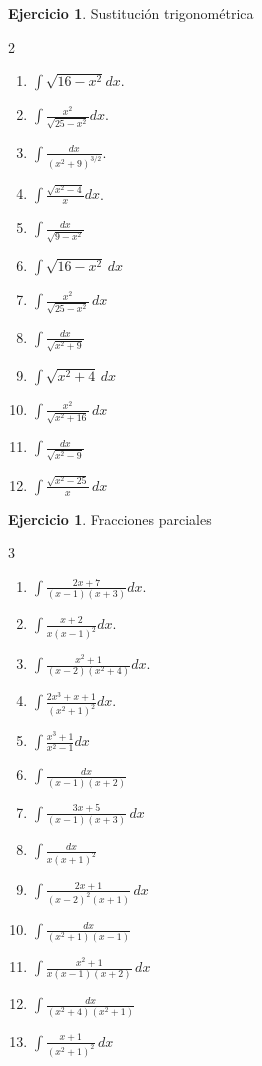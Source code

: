 \documentclass[12pt]{article}
\theoremstyle{definition}
\newtheorem{Ejer}[teorema]{Ejercicio}
\theoremstyle{remark}
\begin{document}
\begin{Ejer}  Sustitución trigonométrica
\begin{multicols}{2}
\begin{enumerate}[resume=integrales]
\item $\int\sqrt{16-x^2}dx$.
\item $\int\frac{x^2}{\sqrt{25-x^2}}dx$.
\item $\int\frac{dx}{(x^2+9)^{3/2}}$.
\item $\int\frac{\sqrt{x^2-4}}{x}dx$.
\item $\displaystyle \int \frac{dx}{\sqrt{9-x^2}}$
\item $\displaystyle \int \sqrt{16-x^2}\,dx$
\item $\displaystyle \int \frac{x^2}{\sqrt{25-x^2}}\,dx$
\item $\displaystyle \int \frac{dx}{\sqrt{x^2+9}}$
\item $\displaystyle \int \sqrt{x^2+4}\,dx$
\item $\displaystyle \int \frac{x^2}{\sqrt{x^2+16}}\,dx$
\item $\displaystyle \int \frac{dx}{\sqrt{x^2-9}}$
\item $\displaystyle \int \frac{\sqrt{x^2-25}}{x}\,dx$
\end{enumerate}
\end{multicols}
\end{Ejer}

\begin{Ejer} Fracciones parciales
\begin{multicols}{3}
\begin{enumerate}[resume=integrales]
\item $\int\frac{2x+7}{(x-1)(x+3)}dx$.
\item $\int\frac{x+2}{x(x-1)^2}dx$.
\item $\int\frac{x^2+1}{(x-2)(x^2+4)}dx$.
\item $\int\frac{2x^3+x+1}{(x^2+1)^2}dx$.
\item $\int\frac{x^3+1}{x^2-1}dx$
\item $\displaystyle \int \frac{dx}{(x-1)(x+2)}$
\item $\displaystyle \int \frac{3x+5}{(x-1)(x+3)}\,dx$
\item $\displaystyle \int \frac{dx}{x(x+1)^2}$
\item $\displaystyle \int \frac{2x+1}{(x-2)^2(x+1)}\,dx$
\item $\displaystyle \int \frac{dx}{(x^2+1)(x-1)}$
\item $\displaystyle \int \frac{x^2+1}{x(x-1)(x+2)}\,dx$
\item $\displaystyle \int \frac{dx}{(x^2+4)(x^2+1)}$
\item $\displaystyle \int \frac{x+1}{(x^2+1)^2}\,dx$
\end{enumerate}
\end{multicols}
\end{Ejer}
\end{document}
